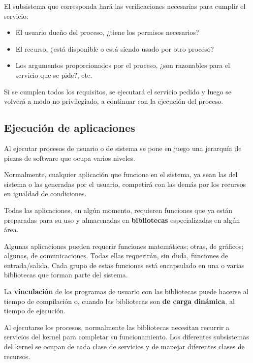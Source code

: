 \documentclass[spanish,A4,]{article}
\begin{document}
El subsistema que corresponda hará las verificaciones necesarias para
cumplir el servicio:

\begin{itemize}
\itemsep1pt\parskip0pt
\item
  El usuario dueño del proceso, ¿tiene los permisos necesarios?
\item
  El recurso, ¿está disponible o está siendo usado por otro proceso?
\item
  Los argumentos proporcionados por el proceso, ¿son razonables para el
  servicio que se pide?, etc.
\end{itemize}

Si se cumplen todos los requisitos, se ejecutará el servicio pedido y
luego se volverá a modo no privilegiado, a continuar con la ejecución
del proceso.

\subsection{Ejecución de
aplicaciones}\label{ejecuciuxf3n-de-aplicaciones}

Al ejecutar procesos de usuario o de sistema se pone en juego una
jerarquía de piezas de software que ocupa varios niveles.

Normalmente, cualquier aplicación que funcione en el sistema, ya sean
las del sistema o las generadas por el usuario, competirá con las demás
por los recursos en igualdad de condiciones.

Todas las aplicaciones, en algún momento, requieren funciones que ya
están preparadas para su uso y almacenadas en \textbf{bibliotecas}
especializadas en algún área.

Algunas aplicaciones pueden requerir funciones matemáticas; otras, de
gráficos; algunas, de comunicaciones. Todas ellas requerirán, sin duda,
funciones de entrada/salida. Cada grupo de estas funciones está
encapsulado en una o varias bibliotecas que forman parte del sistema.

La \textbf{vinculación} de los programas de usuario con las bibliotecas
puede hacerse al tiempo de compilación o, cuando las bibliotecas son
\textbf{de carga dinámica}, al tiempo de ejecución.

Al ejecutarse los procesos, normalmente las bibliotecas necesitan
recurrir a servicios del kernel para completar su funcionamiento. Los
diferentes subsistemas del kernel se ocupan de cada clase de servicios y
de manejar diferentes clases de recursos.
\end{document}
